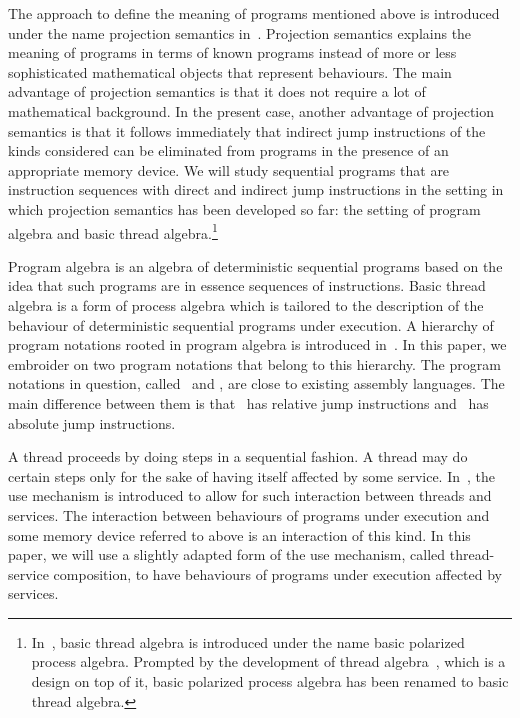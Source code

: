 \documentclass[fleqn]{llncs}
\begin{document}
The approach to define the meaning of programs mentioned above is
introduced under the name projection semantics in~\cite{BL02a}.
Projection semantics explains the meaning of programs in terms of known
programs instead of more or less sophisticated mathematical objects that
represent behaviours.
The main advantage of projection semantics is that it does not require a
lot of mathematical background.
In the present case, another advantage of projection semantics is that
it follows immediately that indirect jump instructions of the kinds
considered can be eliminated from programs in the presence of an
appropriate memory device.
We will study sequential programs that are instruction sequences with
direct and indirect jump instructions in the setting in which projection
semantics has been developed so far: the setting of program algebra and
basic thread algebra.\footnote
{In~\cite{BL02a}, basic thread algebra is introduced under the
 name basic polarized process algebra.
 Prompted by the development of thread algebra~\cite{BM04c}, which is a
 design on top of it, basic polarized process algebra has been renamed
 to basic thread algebra.
}

Program algebra is an algebra of deterministic sequential programs based
on the idea that such programs are in essence sequences of instructions.
Basic thread algebra is a form of process algebra which is tailored to
the description of the behaviour of deterministic sequential programs
under execution.
A hierarchy of program notations rooted in program algebra is introduced
in~\cite{BL02a}.
In this paper, we embroider on two program notations that belong to this
hierarchy.
The program notations in question, called \PGLC\ and \PGLD, are close to
existing assembly languages.
The main difference between them is that \PGLC\ has relative jump
instructions and \PGLD\ has absolute jump instructions.

A thread proceeds by doing steps in a sequential fashion.
A thread may do certain steps only for the sake of having itself
affected by some service.
In~\cite{BP02a}, the use mechanism is introduced to allow for such
interaction between threads and services.
The interaction between behaviours of programs under execution and some
memory device referred to above is an interaction of this kind.
In this paper, we will use a slightly adapted form of the use mechanism,
called thread-service composition, to have behaviours of programs under
execution affected by services.
\end{document}
